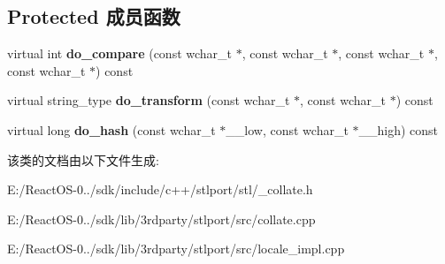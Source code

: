 \subsection*{Protected 成员函数}
\begin{DoxyCompactItemize}
\item 
\mbox{\label{classcollate_3_01wchar__t_01_4_a99f10942405f48f088cfe4a7d90684bf}} 
virtual int {\bfseries do\+\_\+compare} (const wchar\+\_\+t $\ast$, const wchar\+\_\+t $\ast$, const wchar\+\_\+t $\ast$, const wchar\+\_\+t $\ast$) const
\item 
\mbox{\label{classcollate_3_01wchar__t_01_4_ad7a975059ab88819af70143b4c5f9490}} 
virtual string\+\_\+type {\bfseries do\+\_\+transform} (const wchar\+\_\+t $\ast$, const wchar\+\_\+t $\ast$) const
\item 
\mbox{\label{classcollate_3_01wchar__t_01_4_ae816c1c40f8c8a3c1b249944ed7eb3bb}} 
virtual long {\bfseries do\+\_\+hash} (const wchar\+\_\+t $\ast$\+\_\+\+\_\+low, const wchar\+\_\+t $\ast$\+\_\+\+\_\+high) const
\end{DoxyCompactItemize}


该类的文档由以下文件生成\+:\begin{DoxyCompactItemize}
\item 
E\+:/\+React\+O\+S-\/0../sdk/include/c++/stlport/stl/\+\_\+collate.\+h\item 
E\+:/\+React\+O\+S-\/0../sdk/lib/3rdparty/stlport/src/collate.\+cpp\item 
E\+:/\+React\+O\+S-\/0../sdk/lib/3rdparty/stlport/src/locale\+\_\+impl.\+cpp\end{DoxyCompactItemize}
